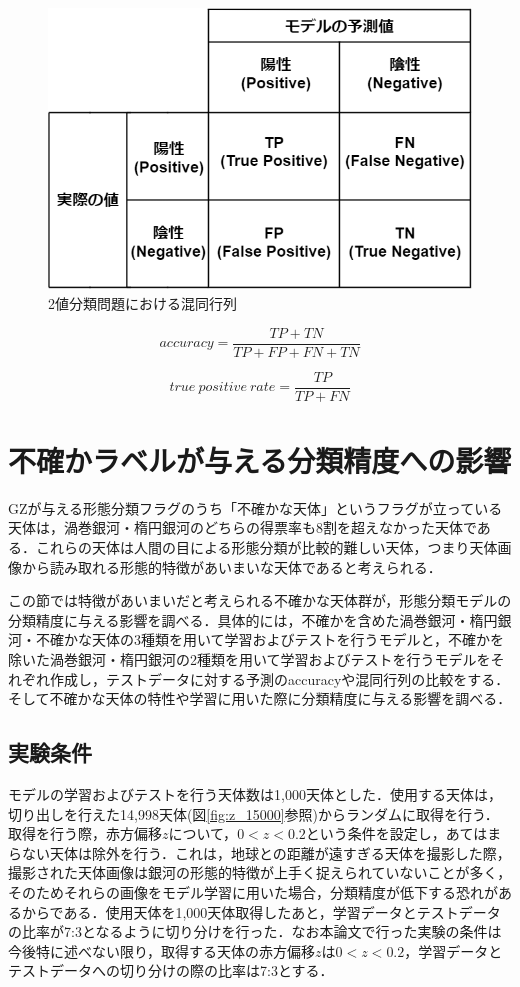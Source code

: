 \documentclass[a4j, 11pt]{jreport}
\begin{document}
\begin{figure}[H]
 \centering
 \includegraphics[width=12cm]{images/cm.png}
 \caption{2値分類問題における混同行列}
 \label{fig:cm}
\end{figure}

\begin{equation}
 accuracy = \frac{TP + TN}{TP + FP + FN + TN}
 \label{equ:accuracy}
\end{equation}

\begin{equation}
 true\:positive\:rate = \frac{TP}{TP + FN}
 \label{}
\end{equation}

\section{不確かラベルが与える分類精度への影響}
GZが与える形態分類フラグのうち「不確かな天体」というフラグが立っている天体は，渦巻銀河・楕円銀河のどちらの得票率も8割を超えなかった天体である．これらの天体は人間の目による形態分類が比較的難しい天体，つまり天体画像から読み取れる形態的特徴があいまいな天体であると考えられる．

この節では特徴があいまいだと考えられる不確かな天体群が，形態分類モデルの分類精度に与える影響を調べる．具体的には，不確かを含めた渦巻銀河・楕円銀河・不確かな天体の3種類を用いて学習およびテストを行うモデルと，不確かを除いた渦巻銀河・楕円銀河の2種類を用いて学習およびテストを行うモデルをそれぞれ作成し，テストデータに対する予測のaccuracyや混同行列の比較をする．そして不確かな天体の特性や学習に用いた際に分類精度に与える影響を調べる．

\subsection{実験条件}
モデルの学習およびテストを行う天体数は1,000天体とした．使用する天体は，切り出しを行えた14,998天体(図\ref{fig:z_15000}参照)からランダムに取得を行う．取得を行う際，赤方偏移$z$について，$0 < z < 0.2$という条件を設定し，あてはまらない天体は除外を行う．これは，地球との距離が遠すぎる天体を撮影した際，撮影された天体画像は銀河の形態的特徴が上手く捉えられていないことが多く，そのためそれらの画像をモデル学習に用いた場合，分類精度が低下する恐れがあるからである．使用天体を1,000天体取得したあと，学習データとテストデータの比率が7:3となるように切り分けを行った．なお本論文で行った実験の条件は今後特に述べない限り，取得する天体の赤方偏移$z$は$0 < z < 0.2$，学習データとテストデータへの切り分けの際の比率は7:3とする．
\end{document}
